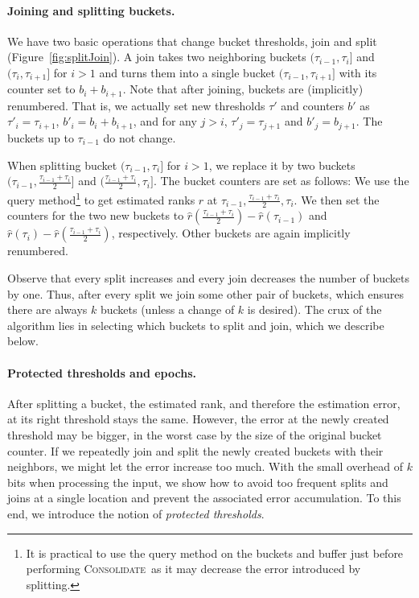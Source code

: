 \documentclass[acmsmall]{acmart}
\newcommand{\consolidate}{\textsc{Consolidate}\xspace}
\theoremstyle{remark}
\begin{document}
\paragraph{Joining and splitting buckets.}
We have two basic operations that change bucket thresholds, join and split (Figure~\ref{fig:splitJoin}). 
A join takes two neighboring buckets $(\tau_{i-1}, \tau_i]$ and $(\tau_{i}, \tau_{i+1}]$ for $i > 1$ and turns them into
a single bucket $(\tau_{i-1}, \tau_{i+1}]$ with its counter set to $b_i + b_{i+1}$.
Note that after joining, buckets are (implicitly) renumbered.
That is, we actually set new thresholds $\tau'$ and counters $b'$ as $\tau'_i = \tau_{i+1}$, $b'_i = b_i + b_{i+1}$, and for any $j > i$, $\tau'_j = \tau_{j+1}$ and $b'_j = b_{j+1}$.
The buckets up to $\tau_{i-1}$ do not change.

When splitting bucket $(\tau_{i-1}, \tau_i]$ for $i > 1$, we replace it by two buckets $(\tau_{i-1}, \frac{\tau_{i-1}+\tau_i}{2}]$ and $(\frac{\tau_{i-1}+\tau_i}{2}, \tau_{i}]$. The bucket counters are set as follows: We use the query method\footnote{%
	It is practical to use the query method on the buckets and buffer just before performing \consolidate\ as it may decrease the error introduced by splitting.
}
to get estimated ranks $\hat{r}$ at $\tau_{i-1}, \frac{\tau_{i-1}+\tau_i}{2},\tau_i$. We then set the counters for the two new buckets to $\hat{r}(\frac{\tau_{i-1}+\tau_i}{2}) - \hat{r}(\tau_{i-1})$ and $\hat{r}(\tau_i) - \hat{r}(\frac{\tau_{i-1}+\tau_i}{2})$, respectively.
Other buckets are again implicitly renumbered.

Observe that every split increases and every join decreases the number of buckets by one.
Thus, after every split we join some other pair of buckets, which ensures there are always $k$ buckets
(unless a change of $k$ is desired).
The crux of the algorithm lies in selecting which buckets to split and join, which we describe below.






\paragraph{Protected thresholds and epochs.}
After splitting a bucket, the estimated rank, and therefore the estimation error, at its right threshold stays the same.
However, the error at the newly created threshold may be bigger, in the worst case by the size of the original bucket counter.
If we repeatedly join and split the newly created buckets with their neighbors, we might let the error increase too much.
With the small overhead of $k$ bits when processing the input, we show how to avoid too frequent splits and joins at a single location and prevent the associated error accumulation.
To this end, we introduce the notion of \emph{protected thresholds}.
\end{document}
